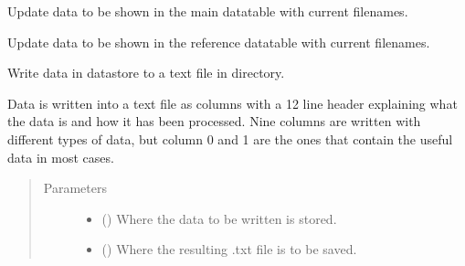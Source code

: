 \documentclass[a4paper,10pt,english]{sphinxmanual}
\begin{document}
\begin{fulllineitems}
\begin{fulllineitems}
\label{\detokenize{sfgtools:sfgtools.SFGProcessTools.update_datatable}}
\sphinxAtStartPar
Update data to be shown in the main datatable with current filenames.

\end{fulllineitems}


\begin{fulllineitems}
\label{\detokenize{sfgtools:sfgtools.SFGProcessTools.update_reftable}}
\sphinxAtStartPar
Update data to be shown in the reference datatable with current filenames.

\end{fulllineitems}


\begin{fulllineitems}
\label{\detokenize{sfgtools:sfgtools.SFGProcessTools.write_data_to_file}}
\sphinxAtStartPar
Write data in datastore to a text file in directory.

\sphinxAtStartPar
Data is written into a text file as columns with a 12 line header explaining what the data is and
how it has been processed. Nine columns are written with different types of data, but column 0 and
1 are the ones that contain the useful data in most cases.
\begin{quote}\begin{description}
\item[{Parameters}] \leavevmode\begin{itemize}
\item {} 
\sphinxAtStartPar
{} () \textendash{} Where the data to be written is stored.

\item {} 
\sphinxAtStartPar
{} () \textendash{} Where the resulting .txt file is to be saved.

\end{itemize}

\end{description}\end{quote}

\end{fulllineitems}


\end{fulllineitems}
\end{document}

